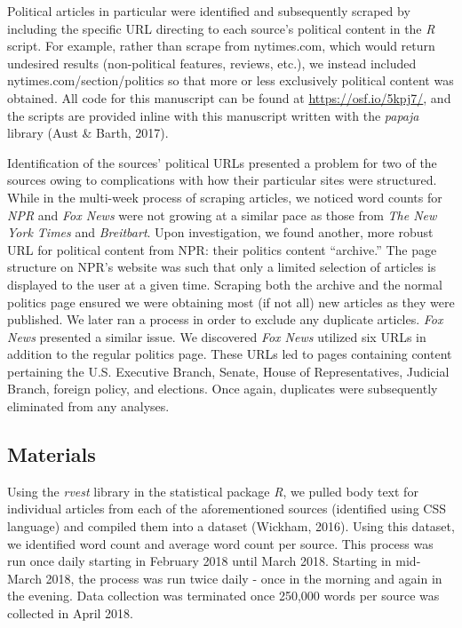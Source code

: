 \documentclass[english,,man]{apa6}
\begin{document}
Political articles in particular were identified and subsequently scraped by including the specific URL directing to each source's political content in the \emph{R} script. For example, rather than scrape from nytimes.com, which would return undesired results (non-political features, reviews, etc.), we instead included nytimes.com/section/politics so that more or less exclusively political content was obtained. All code for this manuscript can be found at \url{https://osf.io/5kpj7/}, and the scripts are provided inline with this manuscript written with the \emph{papaja} library (Aust \& Barth, 2017).

Identification of the sources' political URLs presented a problem for two of the sources owing to complications with how their particular sites were structured. While in the multi-week process of scraping articles, we noticed word counts for \emph{NPR} and \emph{Fox News} were not growing at a similar pace as those from \emph{The New York Times} and \emph{Breitbart}. Upon investigation, we found another, more robust URL for political content from NPR: their politics content \enquote{archive.} The page structure on NPR's website was such that only a limited selection of articles is displayed to the user at a given time. Scraping both the archive and the normal politics page ensured we were obtaining most (if not all) new articles as they were published. We later ran a process in order to exclude any duplicate articles. \emph{Fox News} presented a similar issue. We discovered \emph{Fox News} utilized six URLs in addition to the regular politics page. These URLs led to pages containing content pertaining the U.S. Executive Branch, Senate, House of Representatives, Judicial Branch, foreign policy, and elections. Once again, duplicates were subsequently eliminated from any analyses.

\hypertarget{materials}{%
\subsection{Materials}\label{materials}}

Using the \emph{rvest} library in the statistical package \emph{R}, we pulled body text for individual articles from each of the aforementioned sources (identified using CSS language) and compiled them into a dataset (Wickham, 2016). Using this dataset, we identified word count and average word count per source. This process was run once daily starting in February 2018 until March 2018. Starting in mid-March 2018, the process was run twice daily - once in the morning and again in the evening. Data collection was terminated once 250,000 words per source was collected in April 2018.
\end{document}
